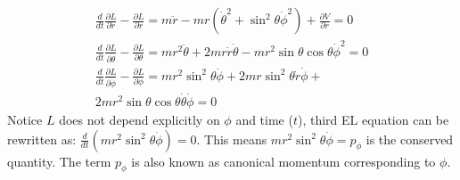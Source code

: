\documentclass[conference]{IEEEtran}
\begin{document}
\begin{equation}
\begin{array}{l}
\frac{d}{d t} \frac{\partial L}{\partial \dot{r}}-\frac{\partial L}{\partial r}=m \ddot{r}-m r\left(\dot{\theta}^{2}+\sin ^{2} \theta \dot{\phi}^{2}\right)+\frac{\partial V}{\partial r}=0 \\
\frac{d}{d t} \frac{\partial L}{\partial \dot{\theta}}-\frac{\partial L}{\partial \theta}=m r^{2} \ddot{\theta}+2 m r \dot{r} \dot{\theta}-m r^{2} \sin \theta \cos \theta \dot{\phi}^{2}=0\\
\frac{d}{d t} \frac{\partial L}{\partial \dot{\phi}}-\frac{\partial L}{\partial \phi}=m r^{2} \sin ^{2} \theta \ddot{\phi}+ 2 m r \sin ^{2} \theta \dot{r} \dot{\phi}+ \\ 2 m r^{2} \sin \theta \cos \theta \dot{\theta} \dot{\phi}=0
\end{array}
\end{equation}
Notice $L$ does not depend explicitly on $\phi$ and time ($t$), third EL equation can be rewritten as:
$\frac{d}{d t}\left(mr^{2}\sin^{2}\theta \dot{\phi}\right) = 0$. This means $mr^{2}\sin^{2}\theta \dot{\phi} = p_{\phi}$ is the conserved quantity. The term $p_{\phi}$ is also known as canonical momentum corresponding to $\phi$.
\end{document}
